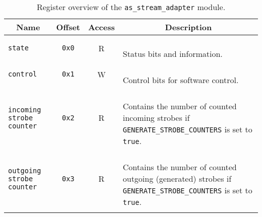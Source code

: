 \begin{longtable}[ht]{|l|c|c|l|}
    \hline
    \multicolumn{1}{|c|}{\textbf{Name}} & \multicolumn{1}{c|}{\textbf{Offset}} & \multicolumn{1}{c|}{\textbf{Access}} & \multicolumn{1}{c|}{\textbf{Description}}\\
    \hline
    
    \texttt{state} & \texttt{0x0} & R & \parbox{8.5cm}{\ \\
        Status bits and information.\vspace{0.3em}
    }\\
    \hline
    
    \texttt{control} & \texttt{0x1} & W & \parbox{8.5cm}{\ \\
        Control bits for software control.\vspace{0.3em}
    }\\
    \hline
    
    \parbox{3.5cm}{\texttt{incoming strobe counter}} & \texttt{0x2} & R & \parbox{8.5cm}{\ \\
        Contains the number of counted incoming strobes if \texttt{GENERATE\_STROBE\_COUNTERS} is set to \texttt{true}.\vspace{0.3em}
    }\\
    \hline
    
    \parbox{3.5cm}{\texttt{outgoing strobe counter}} & \texttt{0x3} & R & \parbox{8.5cm}{\ \\
        Contains the number of counted outgoing (generated) strobes if \texttt{GENERATE\_STROBE\_COUNTERS} is set to \texttt{true}.\vspace{0.3em}
    }\\
    \hline
    \caption{Register overview of the \texttt{as\_stream\_adapter} module.}
\end{longtable}



